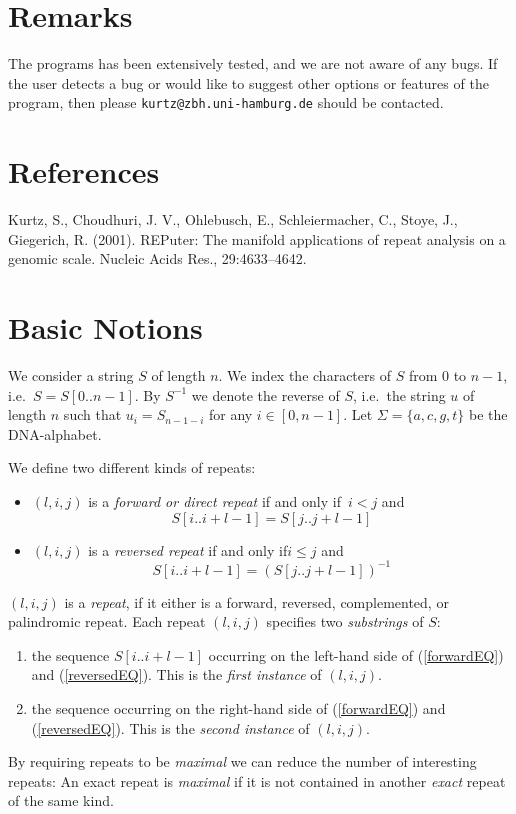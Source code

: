 \documentclass[12pt]{article}
\newcommand{\Iff}{if and only if\xspace}
\newcommand{\Substring}[3]{#1[#2..#3]}
\begin{document}
\section{Remarks}
The programs has been extensively tested, and we are not aware of any bugs.
If the user detects a bug or would like to suggest other options or 
features of the program, then please \texttt{kurtz@zbh.uni-hamburg.de}
should be contacted.

\section*{References}
Kurtz, S., Choudhuri, J. V., Ohlebusch, E., Schleiermacher, C., Stoye, J.,
Giegerich, R. (2001). REPuter: The manifold applications of repeat analysis on
a genomic scale. Nucleic Acids Res., 29:4633–4642.

\appendix
\section{Basic Notions}\label{Basic}
We consider a string \(S\) of length \(n\). We index the characters of
\(S\) from \(0\) to \(n-1\), i.e.\ \(S=\Substring{S}{0}{n-1}\). By 
\(S^{-1}\) we denote the reverse of \(S\), i.e.\ the string \(u\) of length 
\(n\) such that \(u_{i}=S_{n-1-i}\) for 
any \(i\in[0,n-1]\). Let \(\Sigma=\{a,c,g,t\}\) be the DNA-alphabet.

We define two different kinds of repeats:
\begin{itemize}
\item
\((l,i,j)\) is a \emph{forward or direct repeat} \Iff\ \(i<j\) and
\begin{equation}
\Substring{S}{i}{i+l-1}=\Substring{S}{j}{j+l-1}
\label{forwardEQ}
\end{equation}
\item
\((l,i,j)\) is a \emph{reversed repeat} \Iff \(i\leq j\) and
\begin{equation}
\Substring{S}{i}{i+l-1}=(\Substring{S}{j}{j+l-1})^{-1}
\label{reversedEQ}
\end{equation}
\end{itemize}
\((l,i,j)\) is a \emph{repeat}, if it either is a forward, reversed, 
complemented, or palindromic repeat. Each repeat
\((l,i,j)\) specifies two \emph{substrings} of \(S\): 
\begin{enumerate}
\item
the sequence \(\Substring{S}{i}{i+l-1}\) occurring on the left-hand 
side of (\ref{forwardEQ}) and (\ref{reversedEQ}).
This is the \emph{first instance} of \((l,i,j)\).
\item
the sequence occurring on the right-hand 
side of (\ref{forwardEQ}) and (\ref{reversedEQ}).
This is the \emph{second instance} of \((l,i,j)\).
\end{enumerate}

By requiring repeats to be \emph{maximal} we can reduce the number of
interesting repeats:
An exact repeat is \emph{maximal} if it is not contained in another 
\emph{exact} repeat of the same kind. 
\end{document}
